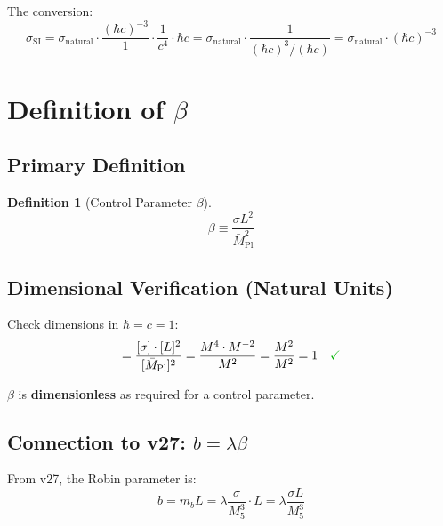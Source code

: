 \documentclass[11pt,a4paper]{article}
\newcommand{\Mpl}{\bar{M}_{\mathrm{Pl}}}
\newcommand{\Mfive}{M_5}
\newcommand{\mb}{m_b}
\newcommand{\emark}{\textcolor{green!70!black}{\checkmark}}
\theoremstyle{definition}
\newtheorem{definition}{Definition}[section]
\theoremstyle{plain}
\theoremstyle{remark}
\begin{document}
The conversion:
\begin{equation}
\sigma_{\text{SI}} = \sigma_{\text{natural}} \cdot \frac{(\hbar c)^{-3}}{1} \cdot \frac{1}{c^4} \cdot \hbar c
= \sigma_{\text{natural}} \cdot \frac{1}{(\hbar c)^3/(\hbar c)} = \sigma_{\text{natural}} \cdot (\hbar c)^{-3}
\label{eq:sigma-conversion}
\end{equation}

\section{Definition of $\beta$}
\label{sec:beta-definition}

\subsection{Primary Definition}

\begin{definition}[Control Parameter $\beta$]
\label{def:beta}
\begin{equation}
\boxed{\beta \equiv \frac{\sigma L^2}{\Mpl^2}}
\label{eq:beta-def}
\end{equation}
\end{definition}

\subsection{Dimensional Verification (Natural Units)}

Check dimensions in $\hbar = c = 1$:
\begin{equation}
[\beta] = \frac{[\sigma] \cdot [L]^2}{[\Mpl]^2} = \frac{M^4 \cdot M^{-2}}{M^2} = \frac{M^2}{M^2} = 1 \quad \emark
\label{eq:beta-dim-check}
\end{equation}

$\beta$ is \textbf{dimensionless} as required for a control parameter.

\subsection{Connection to v27: $b = \lambda\beta$}

From v27, the Robin parameter is:
\begin{equation}
b = \mb L = \lambda \frac{\sigma}{\Mfive^3} \cdot L = \lambda \frac{\sigma L}{\Mfive^3}
\label{eq:b-from-v27}
\end{equation}
\end{document}
